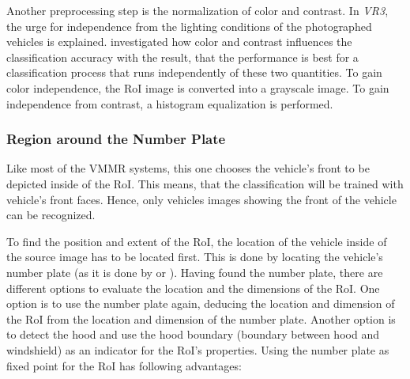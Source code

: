 Another preprocessing step is the normalization of color and contrast. In \emph{VR3}, the urge for independence from the lighting conditions of the photographed vehicles is explained. \citeauthor{petrovic2004analysis} investigated how color and contrast influences the classification accuracy with the result, that the performance is best for a classification process that runs independently of these two quantities. To gain color independence, the RoI image is converted into a grayscale image. To gain independence from contrast, a histogram equalization is performed.

\subsubsection{Region around the Number Plate}\label{sec:regionAroundNumberPlate}
Like most of the VMMR systems, this one chooses the vehicle's front to be depicted inside of the RoI. This means, that the classification will be trained with vehicle's front faces. Hence, only vehicles images showing the front of the vehicle can be recognized.

To find the position and extent of the RoI, the location of the vehicle inside of the source image has to be located first. This is done by locating the vehicle's number plate (as it is done by \citep{petrovic2004analysis} or \citep{siddiqui2015robust}). Having found the number plate, there are different options to evaluate the location and the dimensions of the RoI. One option is to use the number plate again, deducing the location and dimension of the RoI from the location and dimension of the number plate. Another option is to detect the hood and use the hood boundary (boundary between hood and windshield) as an indicator for the RoI's properties. Using the number plate as fixed point for the RoI has following advantages:

